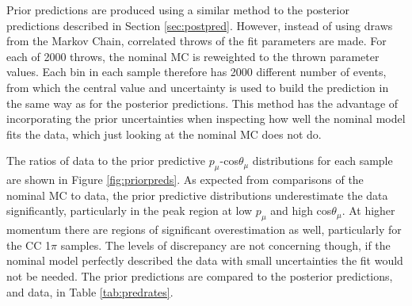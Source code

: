 Prior predictions are produced using a similar method to the posterior predictions described in Section \ref{sec:postpred}. However, instead of using draws from the Markov Chain, correlated throws of the fit parameters are made. For each of 2000 throws, the nominal MC is reweighted to the thrown parameter values. Each bin in each sample therefore has 2000 different number of events, from which the central value and uncertainty is used to build the prediction in the same way as for the posterior predictions. This method has the advantage of incorporating the prior uncertainties when inspecting how well the nominal model fits the data, which just looking at the nominal MC does not do. 

The ratios of data to the prior predictive $p_{\mu}$-cos$\theta_{\mu}$ distributions for each sample are shown in Figure \ref{fig:priorpreds}. As expected from comparisons of the nominal MC to data, the prior predictive distributions underestimate the data significantly, particularly in the peak region at low $p_{\mu}$ and high cos$\theta_{\mu}$. At higher momentum there are regions of significant overestimation as well, particularly for the CC 1$\pi$ samples. The levels of discrepancy are not concerning though, if the nominal model perfectly described the data with small uncertainties the fit would not be needed. The prior predictions are compared to the posterior predictions, and data, in Table \ref{tab:predrates}.

